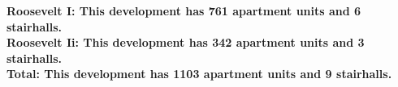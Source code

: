 \bf{Roosevelt I}: This development has 761 apartment units and 6 stairhalls.\\\bf{Roosevelt Ii}: This development has 342 apartment units and 3 stairhalls.\\\bf{Total}: This development has 1103 apartment units and 9 stairhalls.\\